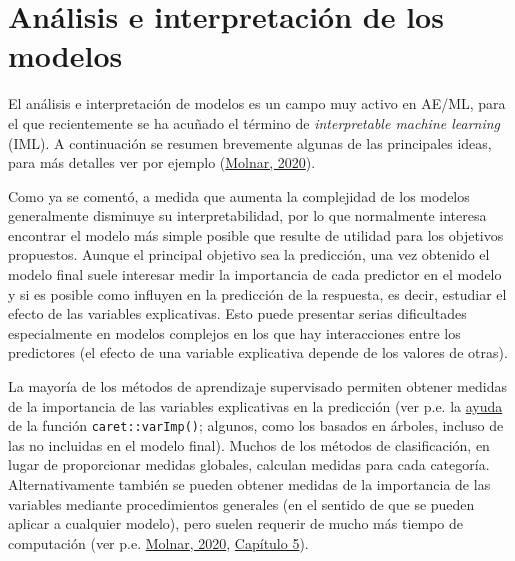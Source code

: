 \documentclass[
  spanish,
]{book}
\theoremstyle{break}
\theoremstyle{definition}
\theoremstyle{definition}
\theoremstyle{definition}
\theoremstyle{definition}
\theoremstyle{remark}
\begin{document}
\hypertarget{analisis-modelos}{%
\section{Análisis e interpretación de los modelos}\label{analisis-modelos}}

El análisis e interpretación de modelos es un campo muy activo en AE/ML, para el que recientemente se ha acuñado el término de \emph{interpretable machine learning} (IML).
A continuación se resumen brevemente algunas de las principales ideas, para más detalles ver por ejemplo (\protect\hyperlink{ref-molnar2020interpretable}{Molnar, 2020}).

Como ya se comentó, a medida que aumenta la complejidad de los modelos generalmente disminuye su interpretabilidad, por lo que normalmente interesa encontrar el modelo más simple posible que resulte de utilidad para los objetivos propuestos.
Aunque el principal objetivo sea la predicción, una vez obtenido el modelo final suele interesar medir la importancia de cada predictor en el modelo y si es posible como influyen en la predicción de la respuesta, es decir, estudiar el efecto de las variables explicativas.
Esto puede presentar serias dificultades especialmente en modelos complejos en los que hay interacciones entre los predictores (el efecto de una variable explicativa depende de los valores de otras).

La mayoría de los métodos de aprendizaje supervisado permiten obtener medidas de la importancia de las variables explicativas en la predicción (ver p.e. la \href{https://topepo.github.io/caret/variable-importance.html}{ayuda} de la función \texttt{caret::varImp()}; algunos, como los basados en árboles, incluso de las no incluidas en el modelo final).
Muchos de los métodos de clasificación, en lugar de proporcionar medidas globales, calculan medidas para cada categoría.
Alternativamente también se pueden obtener medidas de la importancia de las variables mediante procedimientos generales (en el sentido de que se pueden aplicar a cualquier modelo), pero suelen requerir de mucho más tiempo de computación (ver p.e. \href{https://christophm.github.io/interpretable-ml-book}{Molnar, 2020}, \href{https://christophm.github.io/interpretable-ml-book/agnostic.htm}{Capítulo 5}).
\end{document}

